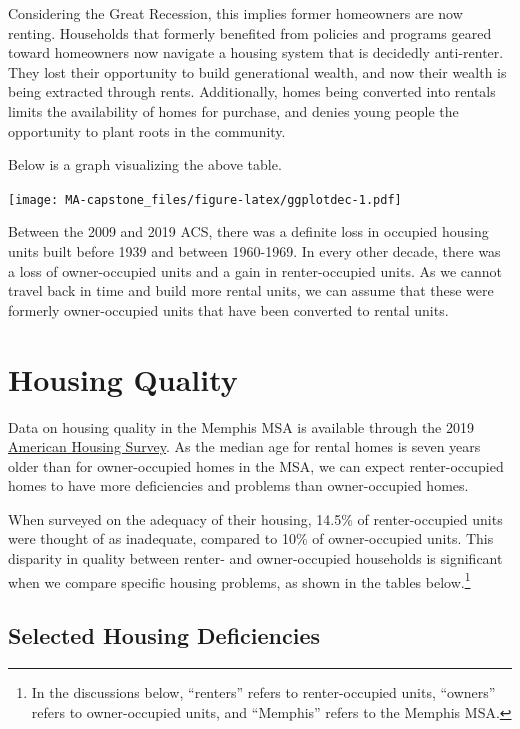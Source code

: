 \documentclass[
  openany]{book}
\begin{document}
Considering the Great Recession, this implies former homeowners are now renting. Households that formerly benefited from policies and programs geared toward homeowners now navigate a housing system that is decidedly anti-renter. They lost their opportunity to build generational wealth, and now their wealth is being extracted through rents. Additionally, homes being converted into rentals limits the availability of homes for purchase, and denies young people the opportunity to plant roots in the community.

Below is a graph visualizing the above table.

\texttt{[image: MA-capstone\_files/figure-latex/ggplotdec-1.pdf]}

Between the 2009 and 2019 ACS, there was a definite loss in occupied housing units built before 1939 and between 1960-1969. In every other decade, there was a loss of owner-occupied units and a gain in renter-occupied units. As we cannot travel back in time and build more rental units, we can assume that these were formerly owner-occupied units that have been converted to rental units.

\hypertarget{housing-quality}{%
\section{Housing Quality}\label{housing-quality}}

Data on housing quality in the Memphis MSA is available through the 2019 \href{https://www.census.gov/programs-surveys/ahs.html}{American Housing Survey}. As the median age for rental homes is seven years older than for owner-occupied homes in the MSA, we can expect renter-occupied homes to have more deficiencies and problems than owner-occupied homes.

When surveyed on the adequacy of their housing, 14.5\% of renter-occupied units were thought of as inadequate, compared to 10\% of owner-occupied units. This disparity in quality between renter- and owner-occupied households is significant when we compare specific housing problems, as shown in the tables below.\footnote{In the discussions below, ``renters'' refers to renter-occupied units, ``owners'' refers to owner-occupied units, and ``Memphis'' refers to the Memphis MSA.}

\hypertarget{selected-housing-deficiencies}{%
\subsection{Selected Housing Deficiencies}\label{selected-housing-deficiencies}}
\end{document}
